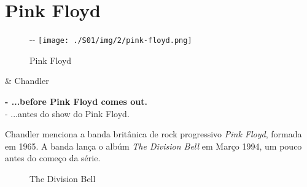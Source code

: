 \hypertarget{pink-floyd}{%
\section{Pink Floyd}\label{pink-floyd}}

\begin{figure}[!ht]
  \begin{adjustwidth}{-\oddsidemargin-1in}{-\rightmargin}
    \centering
    \texttt{[image: ./S01/img/2/pink-floyd.png]}
    \caption{Pink Floyd\label{fig:pink-floyd}}
  \end{adjustwidth}
\end{figure}

\begin{tcolorbox}[enhanced,center upper,
    drop fuzzy shadow southeast, boxrule=0.3pt,
    lower separated=false,
    colframe=black!30!dialogoBorder,colback=white]
\begin{minipage}[c]{0.14\linewidth}
   & \centering \scriptsize{Chandler}
\end{minipage}
\hspace{.1mm}
\begin{minipage}[c]{0.8\linewidth}
  \textbf{- ...before Pink Floyd comes out.}\\
  - ...antes do show do Pink Floyd.
\end{minipage}
\end{tcolorbox}

Chandler menciona a banda britânica de rock progressivo \emph{Pink
Floyd}, formada em 1965. A banda lança o albúm \emph{The Division Bell}
em Março 1994, um pouco antes do começo da série.

\begin{figure}
  \centering
    \caption{The Division Bell\label{fig:the-division-bell}}
\end{figure}

